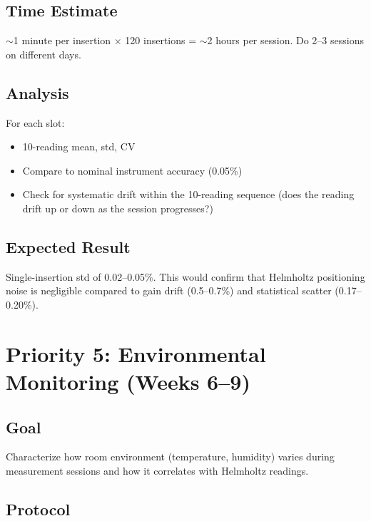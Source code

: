 \documentclass[11pt,letterpaper]{article}
\begin{document}
\subsection{Time Estimate}

${\sim}$1 minute per insertion $\times$ 120 insertions = ${\sim}$2 hours per
session. Do 2--3 sessions on different days.

\subsection{Analysis}

For each slot:
\begin{itemize}[nosep]
  \item 10-reading mean, std, CV
  \item Compare to nominal instrument accuracy (0.05\%)
  \item Check for systematic drift within the 10-reading sequence (does the
    reading drift up or down as the session progresses?)
\end{itemize}

\subsection{Expected Result}

Single-insertion std of 0.02--0.05\%. This would confirm that Helmholtz
positioning noise is negligible compared to gain drift (0.5--0.7\%) and
statistical scatter (0.17--0.20\%).


\section{Priority 5: Environmental Monitoring (Weeks 6--9)}
\label{sec:p5}

\subsection{Goal}

Characterize how room environment (temperature, humidity) varies during
measurement sessions and how it correlates with Helmholtz readings.

\subsection{Protocol}
\end{document}
